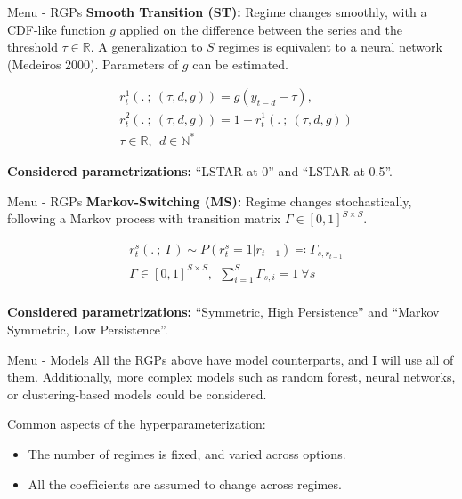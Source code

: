 \documentclass[
  ignorenonframetext,
]{beamer}
\providecommand{\tightlist}{%
  \setlength{\itemsep}{0pt}\setlength{\parskip}{0pt}}\usepackage{longtable,booktabs,array}
\begin{document}
\begin{frame}{Menu - RGPs}
\label{menu---rgps-2}
\textbf{Smooth Transition (ST):} Regime changes smoothly, with a
CDF-like function \(g\) applied on the difference between the series and
the threshold \(\tau \in \mathbb{R}\). A generalization to \(S\) regimes
is equivalent to a neural network (Medeiros 2000). Parameters of \(g\)
can be estimated.

\begin{equation}
\begin{array}{ll}
    &r^1_t(. ~;~ (\tau, d, g)) = g(y_{t - d} - \tau),\\
    &r^2_t(. ~;~ (\tau, d, g)) = 1 - r^1_t(. ~;~ (\tau, d, g))\\
    &\tau \in \mathbb{R}, ~~ d \in \mathbb{N}^*
\end{array}\tag{RGP-ST}
\end{equation}

\textbf{Considered parametrizations:} ``LSTAR at 0'' and ``LSTAR at
0.5''.
\end{frame}

\begin{frame}{Menu - RGPs}
\label{menu---rgps-3}
\textbf{Markov-Switching (MS):} Regime changes stochastically, following
a Markov process with transition matrix
\(\Gamma \in [0, 1]^{S \times S}\).

\begin{equation}
\begin{array}{ll}
    &r^s_t(. ~;~ \Gamma) \sim P(r^s_t = 1 | r_{t-1}) \eqqcolon \Gamma_{s, r_{t-1}}\\
    &\Gamma \in [0, 1]^{S \times S}, ~~ \sum_{i=1}^S \Gamma_{s, i} = 1 ~\forall s\\
\end{array}\tag{RGP-MS}
\end{equation}

\textbf{Considered parametrizations:} ``Symmetric, High Persistence''
and ``Markov Symmetric, Low Persistence''.
\end{frame}

\begin{frame}{Menu - Models}
\label{menu---models}
All the RGPs above have model counterparts, and I will use all of them.
Additionally, more complex models such as random forest, neural
networks, or clustering-based models could be considered.

Common aspects of the hyperparameterization:

\begin{itemize}
\tightlist
\item
  The number of regimes is fixed, and varied across options.
\item
  All the coefficients are assumed to change across regimes.
\end{itemize}
\end{frame}
\end{document}

